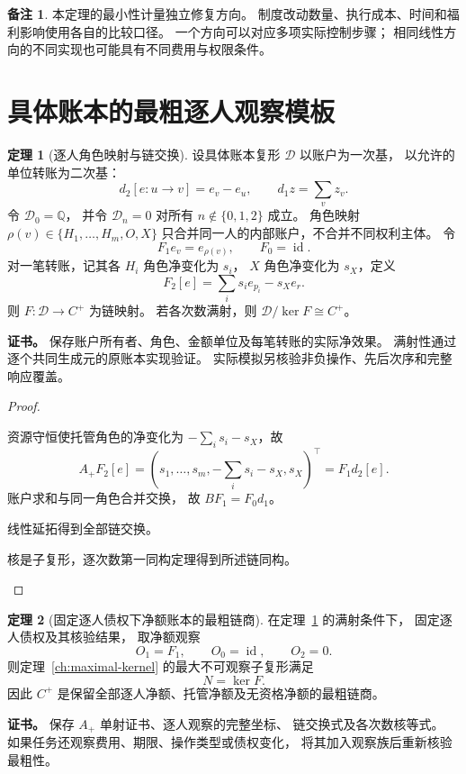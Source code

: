 \documentclass[UTF8,12pt,a4paper,openany,fontset=none,zihao=false]{ctexrep}
\theoremstyle{definition}
\newtheorem{theorem}{定理}[chapter]
\newtheorem{remark}{备注}[chapter]
\newenvironment{certificate}{\par\noindent\textbf{证书。}\ignorespaces}{\par}
\newcommand{\1}{\mathbf 1}
\begin{document}
\begin{remark}
本定理的最小性计量独立修复方向。
制度改动数量、执行成本、时间和福利影响使用各自的比较口径。
一个方向可以对应多项实际控制步骤；
相同线性方向的不同实现也可能具有不同费用与权限条件。
\end{remark}
\section{具体账本的最粗逐人观察模板}
\begin{theorem}[逐人角色映射与链交换]
\label{r:ledger-map}
设具体账本复形 \(\mathcal D\) 以账户为一次基，
以允许的单位转账为二次基：
\[
d_2[e:u\to v]=e_v-e_u,\qquad
d_1z=\sum_v z_v.
\]
令 \(\mathcal D_0=\mathbb Q\)，
并令 \(\mathcal D_n=0\) 对所有 \(n\notin\{0,1,2\}\) 成立。
角色映射 \(\rho(v)\in\{H_1,\ldots,H_m,O,X\}\)
只合并同一人的内部账户，不合并不同权利主体。
令
\[
F_1e_v=e_{\rho(v)},\qquad F_0=\operatorname{id}.
\]
对一笔转账，记其各 \(H_i\) 角色净变化为 \(s_i\)，
\(X\) 角色净变化为 \(s_X\)，定义
\[
F_2[e]=\sum_i s_i e_{p_i}-s_Xe_r.
\]
则 \(F:\mathcal D\to C^+\) 为链映射。
若各次数满射，则 \(\mathcal D/\ker F\cong C^+\)。
\end{theorem}
\begin{certificate}
保存账户所有者、角色、金额单位及每笔转账的实际净效果。
满射性通过逐个共同生成元的原账本实现验证。
实际模拟另核验非负操作、先后次序和完整响应覆盖。
\end{certificate}
\begin{proof}
\begin{semanticsteps}
\item 资源守恒使托管角色的净变化为
\(-\sum_i s_i-s_X\)，故
\[
A_+F_2[e]
=(s_1,\ldots,s_m,-\sum_i s_i-s_X,s_X)^\top
=F_1d_2[e].
\]
账户求和与同一角色合并交换，
故 \(BF_1=F_0d_1\)。
\item 线性延拓得到全部链交换。
\item 核是子复形，逐次数第一同构定理得到所述链同构。
\end{semanticsteps}
\end{proof}
\begin{theorem}[固定逐人债权下净额账本的最粗链商]
\label{r:coarsest-ledger}
在定理~\ref{r:ledger-map} 的满射条件下，
固定逐人债权及其核验结果，
取净额观察
\[
O_1=F_1,\qquad O_0=\operatorname{id},\qquad O_2=0.
\]
则定理~\ref{ch:maximal-kernel} 的最大不可观察子复形满足
\[
N=\ker F.
\]
因此 \(C^+\) 是保留全部逐人净额、托管净额及无资格净额的最粗链商。
\end{theorem}
\begin{certificate}
保存 \(A_+\) 单射证书、逐人观察的完整坐标、
链交换式及各次数核等式。
如果任务还观察费用、期限、操作类型或债权变化，
将其加入观察族后重新核验最粗性。
\end{certificate}
\end{document}
